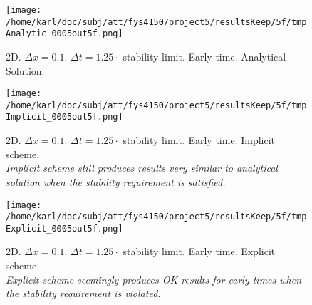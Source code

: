 \documentclass{article}
\begin{document}
\begin{minipage}{.30\textwidth} 
	\begin{figure}[H]
		\centering
		\texttt{[image: /home/karl/doc/subj/att/fys4150/project5/resultsKeep/5f/tmpAnalytic\_0005out5f.png]}
		\caption{2D. $\Delta x = 0.1$. $\Delta t = 1.25 \cdot$ stability limit. Early time. Analytical Solution.\\ \textit{}}
		\label{fig:fig2d7}
	\end{figure}
\end{minipage}\hfill
\begin{minipage}{.30\textwidth} 
	\begin{figure}[H]
		\centering
		\texttt{[image: /home/karl/doc/subj/att/fys4150/project5/resultsKeep/5f/tmpImplicit\_0005out5f.png]}
		\caption{2D. $\Delta x = 0.1$. $\Delta t = 1.25 \cdot$ stability limit. Early time. Implicit scheme.\\ \textit{Implicit scheme still produces results very similar to analytical solution when the stability requirement is satisfied.}}
		\label{fig:fig2d8}
	\end{figure}
\end{minipage}\hfill
\begin{minipage}{.30\textwidth} 
	\begin{figure}[H]
		\centering
		\texttt{[image: /home/karl/doc/subj/att/fys4150/project5/resultsKeep/5f/tmpExplicit\_0005out5f.png]}
		\caption{2D. $\Delta x = 0.1$. $\Delta t = 1.25 \cdot$ stability limit. Early time. Explicit scheme.\\ \textit{Explicit scheme seemingly produces OK results for early times when the stability requirement is violated.}}
		\label{fig:fig2d9}
	\end{figure}
\end{minipage}\hfill
\vspace{2ex}
\end{document}
